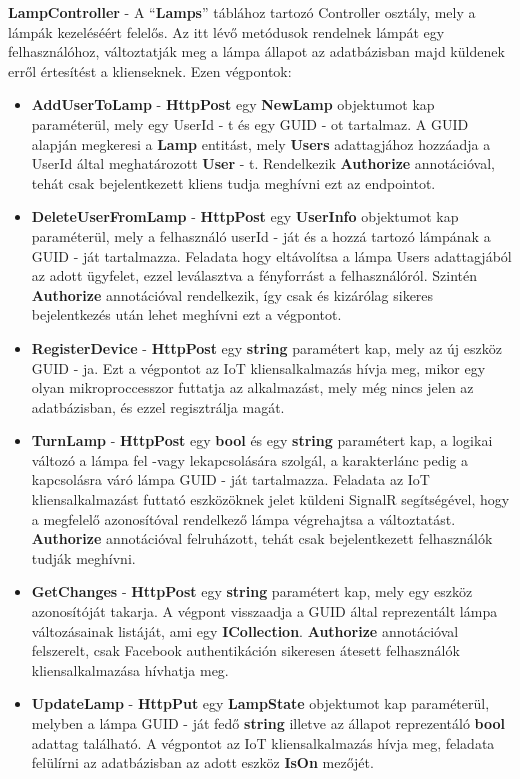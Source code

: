 \documentclass[a4paper,12pt]{report}
\begin{document}
    \textbf{LampController} - A ``\textbf{Lamps}'' táblához tartozó Controller osztály, mely a lámpák kezeléséért felelős. Az itt lévő metódusok
    rendelnek lámpát egy felhasználóhoz, változtatják meg a lámpa állapot az adatbázisban majd küldenek erről értesítést a klienseknek. Ezen végpontok:

\begin{itemize}
    \item \textbf{AddUserToLamp} - \textbf{HttpPost} egy \textbf{NewLamp} objektumot kap paraméterül, mely egy UserId - t és egy GUID - ot tartalmaz.
    A GUID alapján megkeresi a \textbf{Lamp} entitást, mely \textbf{Users} adattagjához hozzáadja a UserId által meghatározott \textbf{User} - t.
    Rendelkezik \textbf{Authorize} annotációval, tehát csak bejelentkezett kliens tudja meghívni ezt az endpointot.
    \item \textbf{DeleteUserFromLamp} - \textbf{HttpPost} egy \textbf{UserInfo} objektumot kap paraméterül, mely a felhasználó userId - ját és
    a hozzá tartozó lámpának a GUID - ját tartalmazza. Feladata hogy eltávolítsa a lámpa Users adattagjából az adott ügyfelet, ezzel leválasztva
    a fényforrást a felhasználóról. Szintén \textbf{Authorize} annotációval rendelkezik, így csak és kizárólag sikeres bejelentkezés után
    lehet meghívni ezt a végpontot.
    \item \textbf{RegisterDevice} - \textbf{HttpPost} egy \textbf{string} paramétert kap, mely az új eszköz GUID - ja. Ezt a végpontot
    az IoT kliensalkalmazás hívja meg, mikor egy olyan mikroproccesszor futtatja az alkalmazást, mely még nincs jelen az adatbázisban,
    és ezzel regisztrálja magát.
    \item \textbf{TurnLamp} - \textbf{HttpPost} egy \textbf{bool} és egy \textbf{string} paramétert kap, a logikai változó a lámpa fel -vagy lekapcsolására
    szolgál, a karakterlánc pedig a kapcsolásra váró lámpa GUID - ját tartalmazza. Feladata az IoT kliensalkalmazást futtató eszközöknek
    jelet küldeni SignalR segítségével, hogy a megfelelő azonosítóval rendelkező lámpa végrehajtsa a változtatást. \textbf{Authorize}
    annotációval felruházott, tehát csak bejelentkezett felhasználók tudják meghívni.
    \item \textbf{GetChanges} - \textbf{HttpPost} egy \textbf{string} paramétert kap, mely egy eszköz azonosítóját takarja. A végpont visszaadja
    a GUID által reprezentált lámpa változásainak listáját, ami egy \textbf{ICollection}. \textbf{Authorize} annotációval felszerelt, csak Facebook
    authentikáción sikeresen átesett felhasználók kliensalkalmazása hívhatja meg.
    \item \textbf{UpdateLamp} - \textbf{HttpPut} egy \textbf{LampState} objektumot kap paraméterül, melyben a lámpa GUID - ját fedő \textbf{string}
    illetve az állapot reprezentáló \textbf{bool} adattag található. A végpontot az IoT kliensalkalmazás hívja meg, feladata felülírni az adatbázisban
    az adott eszköz \textbf{IsOn} mezőjét.
\end{itemize}
\end{document}
